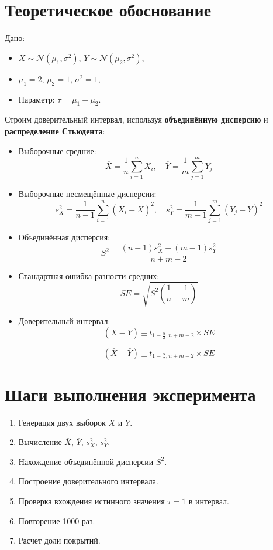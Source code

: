 \documentclass[14pt]{extreport}
\begin{document}
\section*{Теоретическое обоснование}

Дано:
\begin{itemize}
    \item $X \sim \mathcal{N}(\mu_1, \sigma^2)$, $Y \sim \mathcal{N}(\mu_2, \sigma^2)$,
    \item $\mu_1 = 2$, $\mu_2 = 1$, $\sigma^2 = 1$,
    \item Параметр: $\tau = \mu_1 - \mu_2$.
\end{itemize}

\vspace{0.5em}

Строим доверительный интервал, используя \textbf{объединённую дисперсию} и \textbf{распределение Стьюдента}:

\begin{itemize}
    \item Выборочные средние:
    \[
    \overline{X} = \frac{1}{n} \sum_{i=1}^n X_i, \quad \overline{Y} = \frac{1}{m} \sum_{j=1}^m Y_j
    \]
    \item Выборочные несмещённые дисперсии:
    \[
    s_X^2 = \frac{1}{n-1} \sum_{i=1}^n (X_i - \overline{X})^2, \quad s_Y^2 = \frac{1}{m-1} \sum_{j=1}^m (Y_j - \overline{Y})^2
    \]
    \item Объединённая дисперсия:
    \[
    S^2 = \frac{(n-1)s_X^2 + (m-1)s_Y^2}{n + m - 2}
    \]
    \item Стандартная ошибка разности средних:
    \[
    SE = \sqrt{S^2\left(\frac{1}{n} + \frac{1}{m}\right)}
    \]
    \item Доверительный интервал:
    \[
    (\overline{X} - \overline{Y}) \pm t_{1-\frac{\alpha}{2}, n+m-2} \times SE
    \]

    \[
    (\bar{X} - \bar{Y}) \pm t_{1-\frac{\alpha}{2}, n+m-2} \times SE
    \]
\end{itemize}

\section*{Шаги выполнения эксперимента}

\begin{enumerate}
    \item Генерация двух выборок $X$ и $Y$.
    \item Вычисление $\overline{X}$, $\overline{Y}$, $s_X^2$, $s_Y^2$.
    \item Нахождение объединённой дисперсии $S^2$.
    \item Построение доверительного интервала.
    \item Проверка вхождения истинного значения $\tau = 1$ в интервал.
    \item Повторение 1000 раз.
    \item Расчет доли покрытий.
\end{enumerate}
\end{document}
